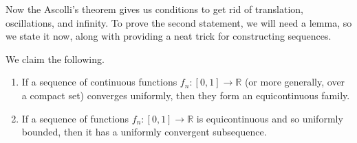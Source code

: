   Now the Ascolli's theorem gives us conditions to get rid of translation, oscillations, and infinity. To prove the second statement, we will need a lemma, so we state it now, along with providing a neat trick for constructing sequences. 

  \begin{theorem}
    We claim the following. 
    \begin{enumerate}
      \item If a sequence of continuous functions $f_n: [0, 1] \to \mathbb{R}$ (or more generally, over a compact set) converges uniformly, then they form an equicontinuous family. 
      \item If a sequence of functions $f_n: [0, 1] \to \mathbb{R}$ is equicontinuous and so uniformly bounded, then it has a uniformly convergent subsequence. 
    \end{enumerate}
  \end{theorem}
